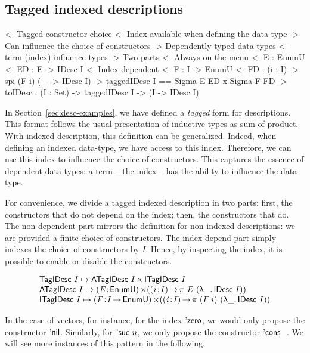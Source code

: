 \subsection{Tagged indexed descriptions}

\begin{wstructure}
<- Tagged constructor choice
    <- Index available when defining the data-type
        -> Can influence the choice of constructors
        -> Dependently-typed data-types
            <- term (index) influence types
    -> Two parts
        <- Always on the menu
            <- E : EnumU 
            <- ED : E -> IDesc I
        <- Index-dependent
            <- F : I -> EnumU 
            <- FD : (i : I) -> spi (F i) (\_ -> IDesc I)
        -> taggedIDesc I == Sigma E ED x Sigma F FD
        -> toIDesc : (I : Set) -> taggedIDesc I -> (I -> IDesc I)
\end{wstructure}

In Section~\ref{sec:desc-examples}, we have defined a \emph{tagged}
form for descriptions. This format follows the usual presentation of
inductive types as sum-of-product. With indexed description, this
definition can be generalized. Indeed, when defining an indexed
data-type, we have access to this index. Therefore, we can use this
index to influence the choice of constructors. This captures the
essence of dependent data-types: a term -- the index -- has the
ability to influence the data-type.

For convenience, we divide a tagged indexed description in two parts:
first, the constructors that do not depend on the index; then, the
constructors that do. The non-dependent part mirrors the definition
for non-indexed descriptions: we are provided a finite choice of
constructors. The index-depend part simply indexes the choice of
constructors by $I$. Hence, by inspecting the index, it is possible to
enable or disable the constructors. 

\[\stk{
 \TagIDesc{I}  \mapsto \TIMES{\ATagIDesc{I}}{\ITagIDesc{I}} \\
 \ATagIDesc{I} \mapsto \SIGMA{\V{E}}{\EnumU} (\PI{\V{i}}{I} \spi{\V{E}}{(\LAM{\_} \IDesc{I})}) \\
 \ITagIDesc{I} \mapsto \SIGMA{\V{F}}{I \To \EnumU} (\PI{\V{i}}{I} \spi{(F\: i)}{(\LAM{\_} \IDesc{I})}) 
}\]

In the case of vectors, for instance, for the index $\NatZero$, we
would only propose the constructor $\ListNil$. Similarly, for
$\NatSuc{n}$, we only propose the constructor $\ListCons{}{}$. We will
see more instances of this pattern in the following.



